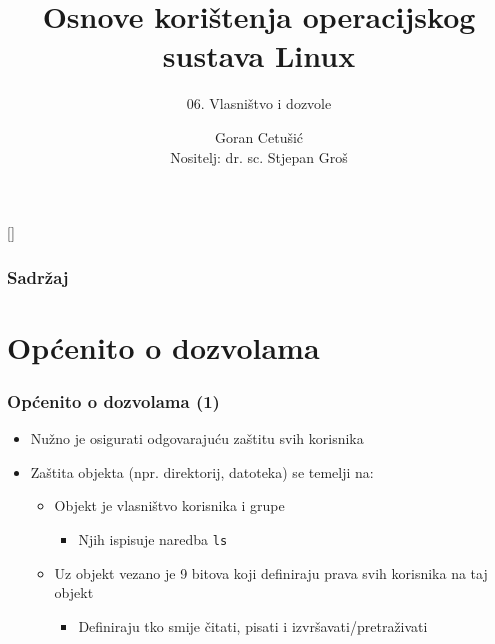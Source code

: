 \documentclass[table,usenames,dvipsnames]{beamer}
\title{Osnove korištenja operacijskog sustava Linux}
\subtitle{06. Vlasništvo i dozvole}
\author[Goran Cetušić]{Goran Cetušić\\{\small Nositelj: dr. sc. Stjepan Groš}}
\institute[FER]{Sveučilište u Zagrebu \\
				Fakultet elektrotehnike i računarstva}
\date{\todayiso}
\newcommand{\shell}[1]{\texttt{#1}}
\begin{document}
{
[] %

\begin{frame}
\maketitle
\end{frame}
}

\begin{frame}
\frametitle{Sadržaj}
\tableofcontents
\end{frame}

\section{Općenito o dozvolama}
\begin{frame}[t]
\frametitle{Općenito o dozvolama (1)}
\begin{itemize}
  \item Nužno je osigurati odgovarajuću zaštitu svih korisnika
  \item Zaštita objekta (npr. direktorij, datoteka) se temelji na:
  \begin{itemize}
    \item Objekt je vlasništvo korisnika i grupe
    \begin{itemize}
      \item Njih ispisuje naredba \shell{ls}
    \end{itemize}
    \item Uz objekt vezano je 9 bitova koji definiraju prava svih
          korisnika na taj objekt
    \begin{itemize}
      \item Definiraju tko smije čitati, pisati i 
               izvršavati/pretraživati
    \end{itemize}
  \end{itemize}
\end{itemize}
\end{frame}
\end{document}
